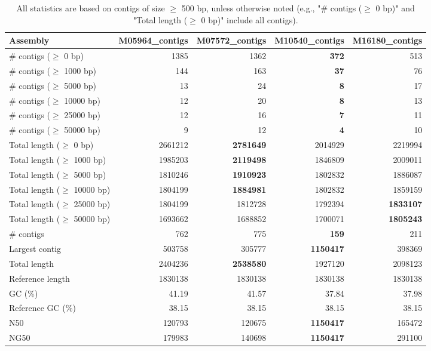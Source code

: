 \documentclass[12pt,a4paper]{article}
\begin{document}
\begin{table}[ht]
\begin{center}
\caption{All statistics are based on contigs of size $\geq$ 500 bp, unless otherwise noted (e.g., "\# contigs ($\geq$ 0 bp)" and "Total length ($\geq$ 0 bp)" include all contigs).}
\begin{tabular}{|l*{4}{|r}|}
\hline
Assembly & M05964\_contigs & M07572\_contigs & M10540\_contigs & M16180\_contigs \\ \hline
\# contigs ($\geq$ 0 bp) & 1385 & 1362 & {\bf 372} & 513 \\ \hline
\# contigs ($\geq$ 1000 bp) & 144 & 163 & {\bf 37} & 76 \\ \hline
\# contigs ($\geq$ 5000 bp) & 13 & 24 & {\bf 8} & 17 \\ \hline
\# contigs ($\geq$ 10000 bp) & 12 & 20 & {\bf 8} & 13 \\ \hline
\# contigs ($\geq$ 25000 bp) & 12 & 16 & {\bf 7} & 11 \\ \hline
\# contigs ($\geq$ 50000 bp) & 9 & 12 & {\bf 4} & 10 \\ \hline
Total length ($\geq$ 0 bp) & 2661212 & {\bf 2781649} & 2014929 & 2219994 \\ \hline
Total length ($\geq$ 1000 bp) & 1985203 & {\bf 2119498} & 1846809 & 2009011 \\ \hline
Total length ($\geq$ 5000 bp) & 1810246 & {\bf 1910923} & 1802832 & 1886087 \\ \hline
Total length ($\geq$ 10000 bp) & 1804199 & {\bf 1884981} & 1802832 & 1859159 \\ \hline
Total length ($\geq$ 25000 bp) & 1804199 & 1812728 & 1792394 & {\bf 1833107} \\ \hline
Total length ($\geq$ 50000 bp) & 1693662 & 1688852 & 1700071 & {\bf 1805243} \\ \hline
\# contigs & 762 & 775 & {\bf 159} & 211 \\ \hline
Largest contig & 503758 & 305777 & {\bf 1150417} & 398369 \\ \hline
Total length & 2404236 & {\bf 2538580} & 1927120 & 2098123 \\ \hline
Reference length & 1830138 & 1830138 & 1830138 & 1830138 \\ \hline
GC (\%) & 41.19 & 41.57 & 37.84 & 37.98 \\ \hline
Reference GC (\%) & 38.15 & 38.15 & 38.15 & 38.15 \\ \hline
N50 & 120793 & 120675 & {\bf 1150417} & 165472 \\ \hline
NG50 & 179983 & 140698 & {\bf 1150417} & 291100 \\ \hline

\end{tabular}
\end{center}
\end{table}
\end{document}
